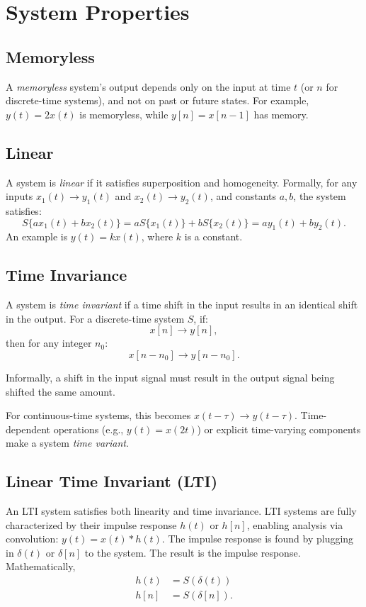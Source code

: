 \section{System Properties}

\subsection{Memoryless}
A \emph{memoryless} system's output depends only on the input at time \( t \) (or \( n \) for discrete-time systems), and not on past or future states. For example, \( y(t) = 2x(t) \) is memoryless, while \( y[n] = x[n-1] \) has memory.

\subsection{Linear}
A system is \emph{linear} if it satisfies superposition and homogeneity. Formally, for any inputs \( x_1(t) \rightarrow y_1(t) \) and \( x_2(t) \rightarrow y_2(t) \), and constants \( a, b \), the system satisfies:
\[
    S\{a x_1(t) + b x_2(t)\} = a S\{x_1(t)\} + b S\{x_2(t)\} = a y_1(t) + b y_2(t).
\]
An example is \( y(t) = kx(t) \), where \( k \) is a constant.

\subsection{Time Invariance}
A system is \emph{time invariant} if a time shift in the input results in an identical shift in the output. For a discrete-time system \( S \), if:
\[
    x[n] \rightarrow y[n],
\]
then for any integer \( n_0 \):
\[
    x[n - n_0] \rightarrow y[n - n_0].
\]

Informally, a shift in the input signal must result in the output signal
being shifted the same amount.

For continuous-time systems, this becomes \( x(t - \tau) \rightarrow y(t - \tau) \). Time-dependent operations (e.g., \( y(t) = x(2t) \)) or explicit time-varying components make a system \emph{time variant}.

\subsection{Linear Time Invariant (LTI)}
An LTI system satisfies both linearity and time invariance.
LTI systems are fully characterized by their impulse response
\( h(t) \) or \( h[n] \), enabling analysis via convolution:
\( y(t) = x(t) * h(t) \). The impulse response is found by
plugging in $\delta(t)$ or $\delta[n]$ to the system. The result
is the impulse response. Mathematically,
\begin{align}
    h(t) & = S(\delta(t))  \\
    h[n] & = S(\delta[n]).
\end{align}


